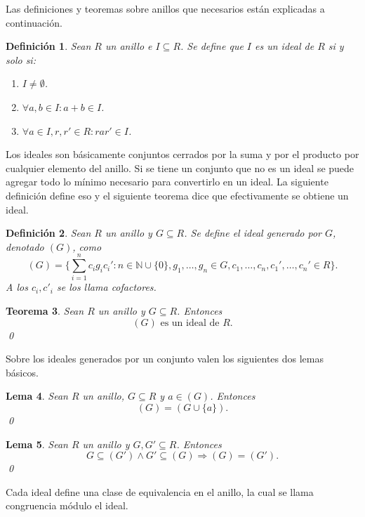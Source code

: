 \documentclass[12pt]{report}
\theoremstyle{customstyle}
\newtheorem{theorem}{Teorema}[chapter]
\newtheorem{definition}[theorem]{Definición}
\newtheorem{lemma}[theorem]{Lema}
\theoremstyle{factstyle}
\begin{document}
Las definiciones y teoremas sobre anillos que necesarios están explicadas a continuación.

\begin{definition}\label{def:ideal}
  Sean $R$ un anillo e $I ⊆ R$. Se define que $I$ es un ideal de $R$ si y solo si:
  \begin{enumerate}
    \item $I ≠ ∅$.
    \item $∀a, b ∈ I : a + b ∈ I$.
    \item $∀a ∈ I, r, r' ∈ R : r a r' ∈ I$.
  \end{enumerate}
\end{definition}

Los ideales son básicamente conjuntos cerrados por la suma y por el producto por cualquier elemento del anillo. Si se tiene un conjunto que no es un ideal se puede agregar todo lo mínimo necesario para convertirlo en un ideal. La siguiente definición define eso y el siguiente teorema dice que efectivamente se obtiene un ideal.

\begin{definition}\label{def:ideal gen}
  Sean $R$ un anillo y $G ⊆ R$. Se define el ideal generado por $G$, denotado $(G)$, como
  \[ (G) = \{∑_{i = 1}^n c_i g_i c_i' : n ∈ ℕ ∪ \{0\}, g_1, …, g_n ∈ G, c_1, …, c_n, c_1', …, c_n' ∈ R\} \text{.}\]
  A los $c_i, c'_i$ se los llama cofactores. %
\end{definition}

\begin{theorem}
  Sean $R$ un anillo y $G ⊆ R$. Entonces
  \[ (G)\text{ es un ideal de }R \text{.}\]
  \qed
\end{theorem}

Sobre los ideales generados por un conjunto valen los siguientes dos lemas básicos.

\begin{lemma}\label{lemma:gen G = gen G U a con a ∈ gen G}
  Sean $R$ un anillo, $G ⊆ R$ y $a ∈ (G)$. Entonces
  \[ (G) = (G ∪ \{a\}) \text{.}\]
  \qed
\end{lemma}

\begin{lemma}\label{lemma:sub gen y sub gen ⇒ eq}
  Sean $R$ un anillo y $G, G' ⊆ R$. Entonces
  \[ G ⊆ (G') ∧ G' ⊆ (G) ⇒ (G) = (G') \text{.}\]
  \qed
\end{lemma}


Cada ideal define una clase de equivalencia en el anillo, la cual se llama congruencia módulo el ideal.
\end{document}
